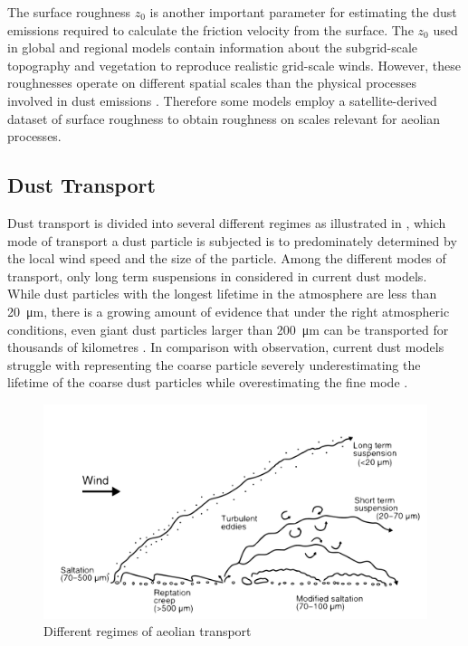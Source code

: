 The surface roughness $z_0$ is another important parameter for estimating the dust emissions required to calculate the friction velocity from the surface. The $z_0$ used in global and regional models contain information about the subgrid-scale topography and vegetation to reproduce realistic grid-scale winds. However, these roughnesses operate on different spatial scales than the physical processes involved in dust emissions \parencite{darmenova_development_2009}. Therefore some models employ a satellite-derived dataset of surface roughness to obtain roughness on scales relevant for aeolian processes. 



\subsection{Dust Transport}
Dust transport is divided into several different regimes as illustrated in , which mode of transport a dust particle is subjected is to predominately determined by the local wind speed and the size of the particle. Among the different modes of transport, only long term suspensions in considered in current dust models. While dust particles with the longest lifetime in the atmosphere are less than \SI{20}{\micro\metre}, there is a growing amount of evidence that under the right atmospheric conditions, even giant dust particles larger than \SI{200}{\micro\metre} can be transported for thousands of kilometres \parencite{van2018mysterious}. In comparison with observation, current dust models struggle with representing the coarse particle severely underestimating the lifetime of the coarse dust particles while overestimating the fine mode \parencite{adebiyi2020dust}. 
\begin{figure}[htbp]
  \centering
  \includegraphics[draft=false,width = \textwidth]{texfiles/figs/aeolian_transport_Parsons_Abrahams.pdf}
  \caption{Different regimes of aeolian transport \parencite{nickling2009aeolian}}
  \label{fig:modes_of_dust_transport}
\end{figure}

